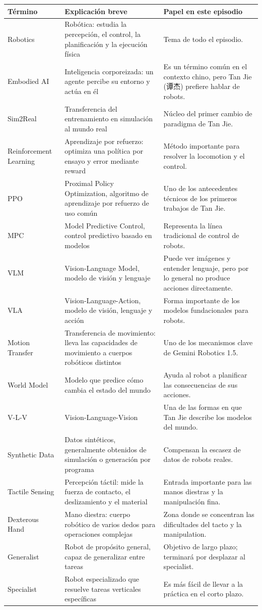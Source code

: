 \documentclass[a4paper]{article}
\begin{document}
\begin{longtable}{p{}p{}p{}}
\toprule
Término & Explicación breve & Papel en este episodio \\
\midrule
Robotics & Robótica: estudia la percepción, el control, la planificación y la ejecución física & Tema de todo el episodio. \\
Embodied AI & Inteligencia corporeizada: un agente percibe su entorno y actúa en él & Es un término común en el contexto chino, pero Tan Jie (谭杰) prefiere hablar de robots. \\
Sim2Real & Transferencia del entrenamiento en simulación al mundo real & Núcleo del primer cambio de paradigma de Tan Jie. \\
Reinforcement Learning & Aprendizaje por refuerzo: optimiza una política por ensayo y error mediante reward & Método importante para resolver la locomotion y el control. \\
PPO & Proximal Policy Optimization, algoritmo de aprendizaje por refuerzo de uso común & Uno de los antecedentes técnicos de los primeros trabajos de Tan Jie. \\
MPC & Model Predictive Control, control predictivo basado en modelos & Representa la línea tradicional de control de robots. \\
VLM & Vision-Language Model, modelo de visión y lenguaje & Puede ver imágenes y entender lenguaje, pero por lo general no produce acciones directamente. \\
VLA & Vision-Language-Action, modelo de visión, lenguaje y acción & Forma importante de los modelos fundacionales para robots. \\
Motion Transfer & Transferencia de movimiento: lleva las capacidades de movimiento a cuerpos robóticos distintos & Uno de los mecanismos clave de Gemini Robotics 1.5. \\
World Model & Modelo que predice cómo cambia el estado del mundo & Ayuda al robot a planificar las consecuencias de sus acciones. \\
V-L-V & Vision-Language-Vision & Una de las formas en que Tan Jie describe los modelos del mundo. \\
Synthetic Data & Datos sintéticos, generalmente obtenidos de simulación o generación por programa & Compensan la escasez de datos de robots reales. \\
Tactile Sensing & Percepción táctil: mide la fuerza de contacto, el deslizamiento y el material & Entrada importante para las manos diestras y la manipulación fina. \\
Dexterous Hand & Mano diestra: cuerpo robótico de varios dedos para operaciones complejas & Zona donde se concentran las dificultades del tacto y la manipulation. \\
Generalist & Robot de propósito general, capaz de generalizar entre tareas & Objetivo de largo plazo; terminará por desplazar al specialist. \\
Specialist & Robot especializado que resuelve tareas verticales específicas & Es más fácil de llevar a la práctica en el corto plazo. \\
\bottomrule
\end{longtable}
\end{document}
